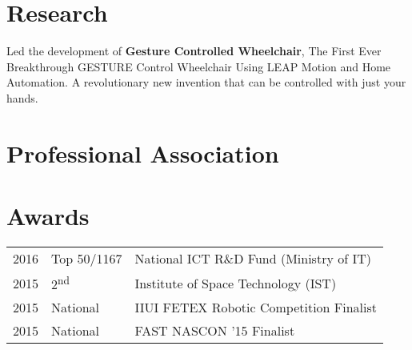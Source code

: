\documentclass[]{deedy-resume-openfont}
\begin{document}
\begin{minipage}[t]{0.66\textwidth}

\section{Research}
Led the development of \textbf{Gesture Controlled Wheelchair}, The First Ever Breakthrough GESTURE Control Wheelchair Using LEAP Motion and Home Automation. A revolutionary new invention that can be controlled with just your hands.
\sectionsep

\section{Professional Association}
\sectionsep


\section{Awards} 
\begin{tabular}{rll}
2016	     & Top 50/1167  & National ICT R\&D Fund (Ministry of IT)\\
2015	     & 2\textsuperscript{nd}  & Institute of Space Technology (IST)\\
2015	     & National  & IIUI FETEX Robotic Competition Finalist\\
2015	     & National  & FAST NASCON '15 Finalist\\
\end{tabular}
\sectionsep



\end{minipage} 
\end{document}
